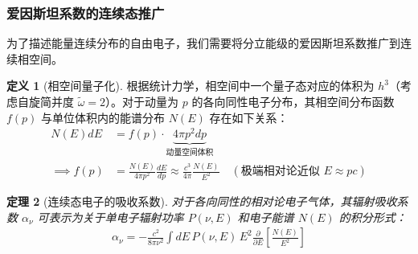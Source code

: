 \documentclass[12pt,oneside]{ctexart}
\theoremstyle{definition}
\newtheorem{definition}{定义}[section]
\theoremstyle{plain}
\newtheorem{theorem}[definition]{定理}
\theoremstyle{remark}
\begin{document}
\subsubsection{爱因斯坦系数的连续态推广}

为了描述能量连续分布的自由电子，我们需要将分立能级的爱因斯坦系数推广到连续相空间。

\begin{definition}[相空间量子化]
    根据统计力学，相空间中一个量子态对应的体积为 $h^3$（考虑自旋简并度 $\tilde{\omega}=2$）。对于动量为 $p$ 的各向同性电子分布，其相空间分布函数 $f(p)$ 与单位体积内的能谱分布 $N(E)$ 存在如下关系：
    \begin{align}
        N(E) dE &= f(p) \cdot \underbrace{4\pi p^2 dp}_{\text{动量空间体积}} \label{eq:number_density_relation} \\
        \implies f(p) &= \frac{N(E)}{4\pi p^2} \frac{dE}{dp} \approx \frac{c^3}{4\pi} \frac{N(E)}{E^2} \quad (\text{极端相对论近似 } E \approx pc) \label{eq:f_p_relation}
    \end{align}
\end{definition}

\begin{theorem}[连续态电子的吸收系数]
    对于各向同性的相对论电子气体，其辐射吸收系数 $\alpha_{\nu}$ 可表示为关于单电子辐射功率 $P(\nu, E)$ 和电子能谱 $N(E)$ 的积分形式：
    \begin{align}
        \alpha_{\nu} = - \frac{c^2}{8\pi \nu^2} \int dE \, P(\nu, E) \, E^2 \frac{\partial}{\partial E} \left[ \frac{N(E)}{E^2} \right] \label{eq:general_alpha}
    \end{align}
\end{theorem}
\end{document}
